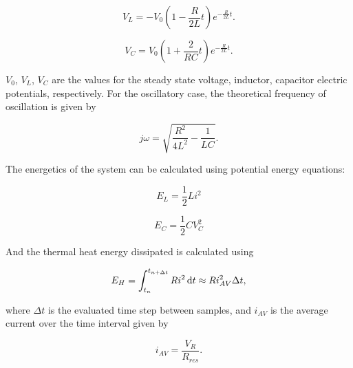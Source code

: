 \begin{equation}\label{eq:vl_theo}
V_L = -V_0 \left(1 - \frac{R}{2 L} t\right) e^{- \frac{R}{2 L}t}.
\end{equation}

\begin{equation}\label{eq:vc_theo}
V_C = V_0 \left(1 + \frac{2}{R C} t\right) e^{- \frac{R}{2 L}t}.
\end{equation}

$V_0$, $V_L$, $V_C$ are the values for the steady state voltage, inductor, capacitor electric potentials,
respectively.
For the oscillatory case, the theoretical frequency of oscillation is given by

\begin{equation}\label{eq:freq}
j \omega = \sqrt{\frac{R^2}{4 L^2} - \frac{1}{L C}}.
\end{equation}

The energetics of the system can be calculated using potential energy equations:

\begin{equation}\label{eq:el}
    E_L = \frac{1}{2} Li^2
\end{equation}

\begin{equation}\label{eq:ec}
    E_C = \frac{1}{2} C V_C^2
\end{equation}

And the thermal heat energy dissipated is calculated using

\begin{equation}\label{eq:heat}
    E_H = \int_{t_n}^{t_{n+\Delta t}} Ri^2 \mathop{}\!\mathrm{d} t \approx R i_{AV}^2 \Delta t,
\end{equation}

where $\Delta t$ is the evaluated time step between samples, and $i_{AV}$ is the average current over the time
interval given by

\begin{equation}\label{eq:i_av}
    i_{AV} = \frac{V_R}{R_{res}}.
\end{equation}

